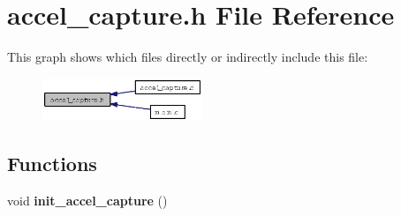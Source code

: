 \section{accel\_\-capture.h File Reference}
\label{accel__capture_8h}


This graph shows which files directly or indirectly include this file:\begin{figure}[H]
\begin{center}
\leavevmode
\includegraphics[width=136pt]{accel__capture_8h__dep__incl}
\end{center}
\end{figure}
\subsection*{Functions}
\begin{CompactItemize}
\item 
void {\bf init\_\-accel\_\-capture} ()
\end{CompactItemize}
